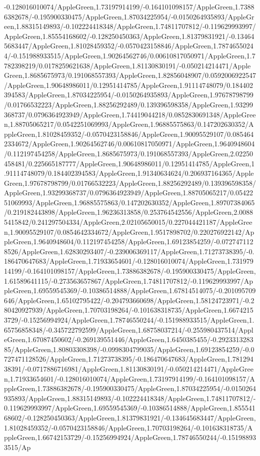 {\begin{tikzternal}
{-0.128016010074/AppleGreen,1.73197914199/-0.164101098157/AppleGreen,1.73886382678/-0.195900330475/AppleGreen,1.87034225954/-0.0150264935893/AppleGreen,1.88315149893/-0.102224418348/AppleGreen,1.74811707812/-0.119629993997/AppleGreen,1.85554168602/-0.128250450363/AppleGreen,1.81379831921/-0.134645683447/AppleGreen,1.81028459352/-0.0570423158846/AppleGreen,1.78746550244/-0.151988933515/AppleGreen,1.90264562746/0.00610817050971/AppleGreen,1.7782398219/0.0178259621638/AppleGreen,1.81130830191/-0.050214214471/AppleGreen,1.8685675973/0.191068557393/AppleGreen,1.82856048907/0.0592006922547/AppleGreen,1.90648986011/0.12951414785/AppleGreen,1.91114748079/0.184402394583/AppleGreen,1.87034225954/-0.0150264935893/AppleGreen,1.97678798799/0.01766532223/AppleGreen,1.88256292489/0.139396598358/AppleGreen,1.93299368737/0.0796364923949/AppleGreen,1.74419044218/0.0852830691348/AppleGreen,1.88705065217/0.0542251069993/AppleGreen,1.96885575863/0.147202630352/AppleGreen,1.81028459352/-0.0570423158846/AppleGreen,1.90095529107/0.0854642334672/AppleGreen,1.90264562746/0.00610817050971/AppleGreen,1.9640948604/0.112197454258/AppleGreen,1.8685675973/0.191068557393/AppleGreen,2.02250458481/0.225665187777/AppleGreen,1.90648986011/0.12951414785/AppleGreen,1.91114748079/0.184402394583/AppleGreen,1.91340634624/0.206937164365/AppleGreen,1.97678798799/0.01766532223/AppleGreen,1.88256292489/0.139396598358/AppleGreen,1.93299368737/0.0796364923949/AppleGreen,1.88705065217/0.0542251069993/AppleGreen,1.96885575863/0.147202630352/AppleGreen,1.89707384065/0.219182443898/AppleGreen,1.96236313858/0.253764542556/AppleGreen,2.00885415842/0.241297504334/AppleGreen,2.02105650015/0.227044421187/AppleGreen,1.90095529107/0.0854642334672/AppleGreen,1.9517898702/0.220276922142/AppleGreen,1.9640948604/0.112197454258/AppleGreen,1.69123854259/-0.0727471128526/AppleGreen,1.62830293407/-0.239006369117/AppleGreen,1.71273738395/-0.186470647683/AppleGreen,1.71933654601/-0.128016010074/AppleGreen,1.73197914199/-0.164101098157/AppleGreen,1.73886382678/-0.195900330475/AppleGreen,1.61589641115/-0.273563657867/AppleGreen,1.74811707812/-0.119629993997/AppleGreen,1.69559545369/-0.10386514888/AppleGreen,1.67814514075/-0.201095709646/AppleGreen,1.65102795422/-0.204793660698/AppleGreen,1.58124723971/-0.280420927939/AppleGreen,1.70703198264/-0.101638318735/AppleGreen,1.66742153729/-0.15256994924/AppleGreen,1.78746550244/-0.151988933515/AppleGreen,1.65756858348/-0.345722792599/AppleGreen,1.68758037214/-0.255980437514/AppleGreen,1.67087450602/-0.269139551446/AppleGreen,1.6450385455/-0.292331328385/AppleGreen,1.80803308398/-0.0998304799035/AppleGreen,1.69123854259/-0.0727471128526/AppleGreen,1.71273738395/-0.186470647683/AppleGreen,1.78129438391/-0.0717886716981/AppleGreen,1.81130830191/-0.050214214471/AppleGreen,1.71933654601/-0.128016010074/AppleGreen,1.73197914199/-0.164101098157/AppleGreen,1.73886382678/-0.195900330475/AppleGreen,1.87034225954/-0.0150264935893/AppleGreen,1.88315149893/-0.102224418348/AppleGreen,1.74811707812/-0.119629993997/AppleGreen,1.69559545369/-0.10386514888/AppleGreen,1.85554168602/-0.128250450363/AppleGreen,1.81379831921/-0.134645683447/AppleGreen,1.81028459352/-0.0570423158846/AppleGreen,1.70703198264/-0.101638318735/AppleGreen,1.66742153729/-0.15256994924/AppleGreen,1.78746550244/-0.151988933515/Ap}
\end{tikzternal}}
